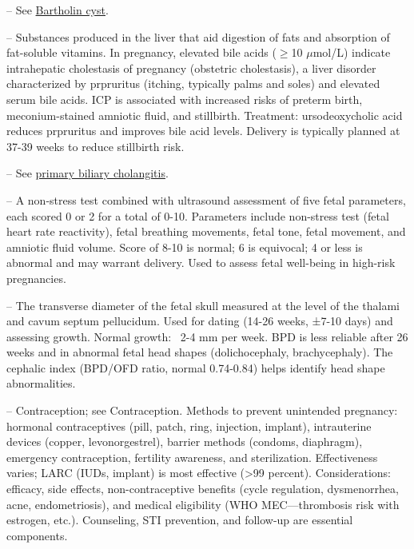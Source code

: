 -- See \hyperlink{Bartholin Cyst}{Bartholin cyst}.

-- Substances produced in the liver that aid digestion of fats and absorption of fat-soluble vitamins. In pregnancy, elevated bile acids (\(\ge\)10 \(\mu\)mol/L) indicate intrahepatic cholestasis of pregnancy (obstetric cholestasis), a liver disorder characterized by prpruritus (itching, typically palms and soles) and elevated serum bile acids. ICP is associated with increased risks of preterm birth, meconium-stained amniotic fluid, and stillbirth. Treatment: ursodeoxycholic acid reduces prpruritus and improves bile acid levels. Delivery is typically planned at 37-39 weeks to reduce stillbirth risk.

-- See \hyperlink{Primary Biliary Cholangitis}{primary biliary cholangitis}.

-- A non-stress test combined with ultrasound assessment of five fetal parameters, each scored 0 or 2 for a total of 0-10. Parameters include non-stress test (fetal heart rate reactivity), fetal breathing movements, fetal tone, fetal movement, and amniotic fluid volume. Score of 8-10 is normal; 6 is equivocal; 4 or less is abnormal and may warrant delivery. Used to assess fetal well-being in high-risk pregnancies.

-- The transverse diameter of the fetal skull measured at the level of the thalami and cavum septum pellucidum. Used for dating (14-26 weeks, ±7-10 days) and assessing growth. Normal growth: ~2-4 mm per week. BPD is less reliable after 26 weeks and in abnormal fetal head shapes (dolichocephaly, brachycephaly). The cephalic index (BPD/OFD ratio, normal 0.74-0.84) helps identify head shape abnormalities.

-- Contraception; see Contraception. Methods to prevent unintended pregnancy: hormonal contraceptives (pill, patch, ring, injection, implant), intrauterine devices (copper, levonorgestrel), barrier methods (condoms, diaphragm), emergency contraception, fertility awareness, and sterilization. Effectiveness varies; LARC (IUDs, implant) is most effective (>99 percent). Considerations: efficacy, side effects, non-contraceptive benefits (cycle regulation, dysmenorrhea, acne, endometriosis), and medical eligibility (WHO MEC—thrombosis risk with estrogen, etc.). Counseling, STI prevention, and follow-up are essential components.


